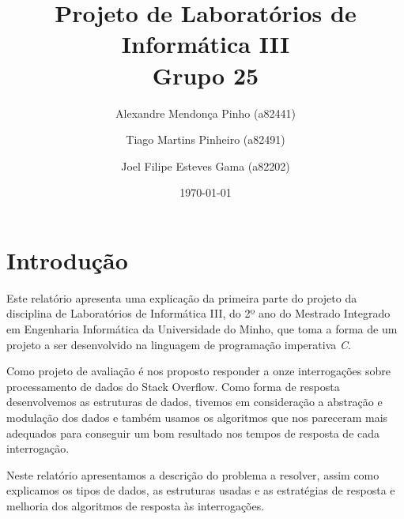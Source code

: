 \documentclass[10pt]{report}
\title{Projeto de Laboratórios de Informática III\\Grupo 25	}
\author{Alexandre Mendonça Pinho (a82441) \and Tiago Martins Pinheiro (a82491) \and Joel Filipe Esteves Gama (a82202)}
\date{\today}
\newcommand\tab[1][0.5cm]{\hspace*{#1}}
\begin{document}
\maketitle

\tableofcontents
\chapter{Introdução}
\label{sec:intro}

\tab Este relatório apresenta uma explicação da primeira parte do projeto da disciplina de Laboratórios de Informática III, do 2º ano do Mestrado Integrado em Engenharia Informática da Universidade do Minho, que toma a forma de um projeto a ser desenvolvido na linguagem de programação imperativa \textit{C}.

Como projeto de avaliação é nos proposto responder a onze interrogações sobre processamento de dados do Stack Overflow. Como forma de resposta desenvolvemos as estruturas de dados, tivemos em consideração a abstração e modulação dos dados e também usamos os algoritmos que nos pareceram mais adequados para conseguir um bom resultado nos tempos de resposta de cada interrogação.

Neste relatório apresentamos a descrição do problema a resolver, assim como explicamos os tipos de dados, as estruturas usadas e as estratégias de resposta e melhoria dos algoritmos de resposta às interrogações.
\end{document}

